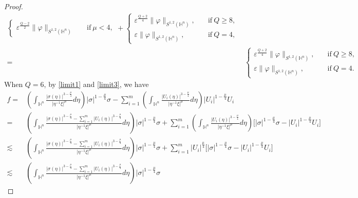 \documentclass[10pt,a4paper]{amsart}
\begin{document}
\begin{proof}
\begin{align}
\begin{cases}
\varepsilon^{\frac{Q-2}{2}}\|\varphi\|_{S^{1,2}(\mathbb{H}^{n})} \quad & \mathrm{if} ~ \mu<4,
\end{cases}
+
\begin{cases}
 \varepsilon^{\frac{Q+2}{4}}\|\varphi\|_{S^{1,2}(\mathbb{H}^{n})}, \quad & \mathrm{if} ~ Q\geq8, \\
 \varepsilon \|\varphi\|_{S^{1,2}(\mathbb{H}^{n})}, \quad & \mathrm{if} ~ Q=4,
 \end{cases} \nonumber\\
 = &
 \begin{cases}
 \varepsilon^{\frac{Q+2}{4}}\|\varphi\|_{S^{1,2}(\mathbb{H}^{n})}, \quad & \mathrm{if} ~ Q\geq8, \\
 \varepsilon \|\varphi\|_{S^{1,2}(\mathbb{H}^{n})}, \quad & \mathrm{if} ~ Q=4.
 \end{cases}
\end{align}
When $Q=6$, by \eqref{limit1} and \eqref{limit3},  we have
\begin{align}\label{main21}
f=&\left(\int_{\mathbb{H}^{n}}\frac{|\sigma(\eta)|^{3-\frac{\mu}{4}}
}{|\eta^{-1}\xi|^{\mu}}{d}\eta\right)|\sigma|^{1-\frac{\mu}{4}}\sigma-\sum\limits_{i=1}^m
\left(\int_{\mathbb{H}^{n}}\frac{|U_i(\eta)|^{3-\frac{\mu}{4}}}
{|\eta^{-1}\xi|^{\mu}}{d}\eta\right)|U_i|^{1-\frac{\mu}{4}}U_i \nonumber\\
=&\left(\int_{\mathbb{H}^{n}}\frac{|\sigma(\eta)|^{3-\frac{\mu}{4}}
-\sum\limits_{i=1}^m|U_i(\eta)|^{3-\frac{\mu}{4}}}{|\eta^{-1}\xi|^{\mu}}{d}\eta\right)|\sigma|^{1-\frac{\mu}{4}}\sigma
+\sum\limits_{i=1}^m
\left(\int_{\mathbb{H}^{n}}\frac{|U_i(\eta)|^{3-\frac{\mu}{4}}}
{|\eta^{-1}\xi|^{\mu}}{d}\eta\right)\Big[|\sigma|^{1-\frac{\mu}{4}}\sigma-|U_i|^{1-\frac{\mu}{4}}U_i\Big]\nonumber\\
\lesssim &\left(\int_{\mathbb{H}^{n}}\frac{|\sigma(\eta)|^{3-\frac{\mu}{4}}
-\sum\limits_{i=1}^m|U_i(\eta)|^{3-\frac{\mu}{4}}}{|\eta^{-1}\xi|^{\mu}}{d}\eta\right)|\sigma|^{1-\frac{\mu}{4}}\sigma
+\sum\limits_{i=1}^m
|U_i|^{\frac{\mu}{4}}\Big[|\sigma|^{1-\frac{\mu}{4}}\sigma-|U_i|^{1-\frac{\mu}{4}}U_i\Big] \nonumber\\
\lesssim  &\left(\int_{\mathbb{H}^{n}}\frac{|\sigma(\eta)|^{3-\frac{\mu}{4}}
-\sum\limits_{i=1}^m|U_i(\eta)|^{3-\frac{\mu}{4}}}{|\eta^{-1}\xi|^{\mu}}{d}\eta\right)|\sigma|^{1-\frac{\mu}{4}}\sigma

\end{align}
\end{proof}
\end{document}

